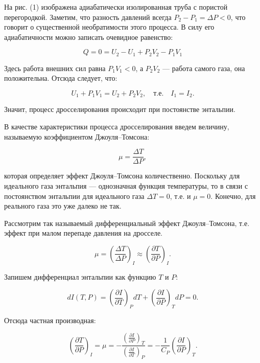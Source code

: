 \documentclass[a4paper,12pt]{article}
\begin{document}
На рис. (1) изображена адиабатически изолированная труба с пористой перегородкой. Заметим, что разность давлений всегда $P_2 - P_1 = \Delta P < 0$, что говорит о существенной необратимости этого процесса. В силу его адиабатичности можно записать очевидное равенство:

\begin{equation}
Q = 0 = U_2 - U_1 + P_2V_2 - P_1V_1
\end{equation}

Здесь работа внешних сил равна $P_1V_1 < 0$, а $P_2V_2$ — работа самого газа, она положительна. Отсюда следует, что:

\begin{equation}
U_1 + P_1V_1 = U_2 + P_2V_2, \quad \text{т.е.} \quad I_1 = I_2.
\end{equation}

Значит, процесс дросселирования происходит при постоянстве энтальпии. 

В качестве характеристики процесса дросселирования введем величину, называемую коэффициентом Джоуля–Томсона:

\begin{equation}
\mu = \frac{\Delta T}{\Delta P},
\end{equation}

которая определяет эффект Джоуля–Томсона количественно. Поскольку для идеального газа энтальпия — однозначная функция температуры, то в связи с постоянством энтальпии для идеального газа $\Delta T = 0$, т.е. и $\mu = 0$. Конечно, для реального газа это уже далеко не так.

Рассмотрим так называемый дифференциальный эффект Джоуля–Томсона, т.е. эффект при малом перепаде давления на дросселе.

\begin{equation}
\mu = \left( \frac{\Delta T}{\Delta P} \right)_I \approx \left( \frac{\partial T}{\partial P} \right)_I.
\end{equation}

Запишем дифференциал энтальпии как функцию $T$ и $P$:

\begin{equation}
dI(T, P) = \left( \frac{\partial I}{\partial T} \right)_P dT + \left( \frac{\partial I}{\partial P} \right)_T dP = 0.
\end{equation}

Отсюда частная производная:

\begin{equation}
\left( \frac{\partial T}{\partial P} \right)_I = \mu = -\frac{\left( \frac{\partial I}{\partial P} \right)_T}{\left( \frac{\partial I}{\partial T} \right)_P} = -\frac{1}{C_P} \left( \frac{\partial I}{\partial P} \right)_T.
\end{equation}
\end{document}
